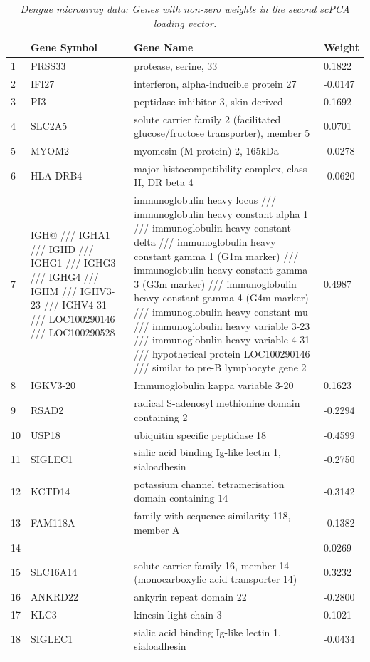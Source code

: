 \documentclass{article}
\begin{document}
\begin{longtable}{| l | p{4cm} | p{8cm} | l |}
  \caption{{\em Dengue microarray data: Genes with non-zero weights in the second scPCA loading vector.}}  \label{tab:dengue_2} \\
  \hline
 & Gene Symbol & Gene Name & Weight \\ 
  \hline
  \endhead
  1 & PRSS33 & protease, serine, 33 & 0.1822 \\ 
  2 & IFI27 & interferon, alpha-inducible protein 27 & -0.0147 \\ 
  3 & PI3 & peptidase inhibitor 3, skin-derived & 0.1692 \\ 
  4 & SLC2A5 & solute carrier family 2 (facilitated glucose/fructose transporter), member 5 & 0.0701 \\ 
  5 & MYOM2 & myomesin (M-protein) 2, 165kDa & -0.0278 \\ 
  6 & HLA-DRB4 & major histocompatibility complex, class II, DR beta 4 & -0.0620 \\ 
  7 & IGH@ /// IGHA1 /// IGHD /// IGHG1 /// IGHG3 /// IGHG4 /// IGHM /// IGHV3-23 /// IGHV4-31 /// LOC100290146 /// LOC100290528 & immunoglobulin heavy locus /// immunoglobulin heavy constant alpha 1 /// immunoglobulin heavy constant delta /// immunoglobulin heavy constant gamma 1 (G1m marker) /// immunoglobulin heavy constant gamma 3 (G3m marker) /// immunoglobulin heavy constant gamma 4 (G4m marker) /// immunoglobulin heavy constant mu /// immunoglobulin heavy variable 3-23 /// immunoglobulin heavy variable 4-31 /// hypothetical protein LOC100290146 /// similar to pre-B lymphocyte gene 2 & 0.4987 \\ 
  8 & IGKV3-20 & Immunoglobulin kappa variable 3-20 & 0.1623 \\ 
  9 & RSAD2 & radical S-adenosyl methionine domain containing 2 & -0.2294 \\ 
  10 & USP18 & ubiquitin specific peptidase 18 & -0.4599 \\ 
  11 & SIGLEC1 & sialic acid binding Ig-like lectin 1, sialoadhesin & -0.2750 \\ 
  12 & KCTD14 & potassium channel tetramerisation domain containing 14 & -0.3142 \\ 
  13 & FAM118A & family with sequence similarity 118, member A & -0.1382 \\ 
  14 &  &  & 0.0269 \\ 
  15 & SLC16A14 & solute carrier family 16, member 14 (monocarboxylic acid transporter 14) & 0.3232 \\ 
  16 & ANKRD22 & ankyrin repeat domain 22 & -0.2800 \\ 
  17 & KLC3 & kinesin light chain 3 & 0.1021 \\ 
  18 & SIGLEC1 & sialic acid binding Ig-like lectin 1, sialoadhesin & -0.0434 \\ 
   \hline
\end{longtable}
\end{document}
